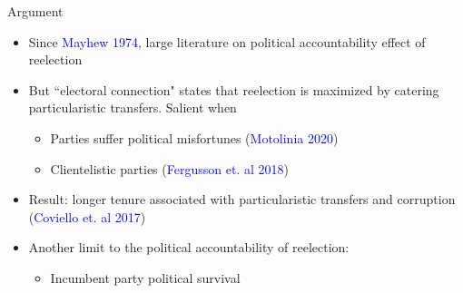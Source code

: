 \documentclass{beamer}
\begin{document}
\begin{frame}[label=argument]{Argument}

\begin{itemize}
 		  \setlength\itemsep{1em}
	
	\item  Since \textcolor{blue}{Mayhew 1974}, large literature on political accountability effect of reelection
	\item But ``electoral connection" states that reelection is maximized by catering particularistic transfers. Salient when
		\begin{itemize}
		\item Parties suffer political misfortunes (\textcolor{blue}{Motolinia 2020})
		\item Clientelistic parties (\textcolor{blue}{Fergusson et. al 2018})
		\end{itemize} 
	\item Result: longer tenure associated with particularistic transfers and corruption (\textcolor{blue}{Coviello et. al 2017}) 
	\item Another limit to the political accountability of reelection:
	\begin{itemize}

	\item 
	\alert{Incumbent party political survival} %
	\end{itemize} 

\end{itemize} 
	 
\end{frame} 
\end{document}
